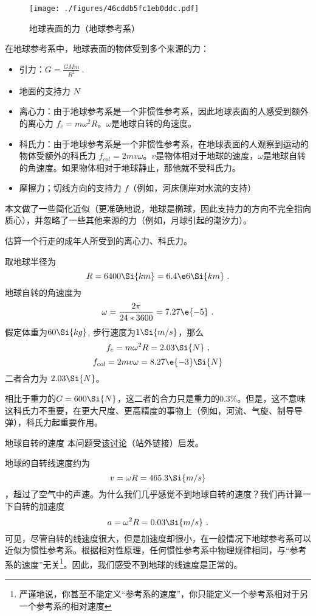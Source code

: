 
\begin{issues}
\issueDraft
{} 
\end{issues}

\begin{figure}[ht]
\centering
\texttt{[image: ./figures/46cddb5fc1eb0ddc.pdf]}
\caption{地球表面的力（地球参考系）} \label{fig_FOE_1}
\end{figure}

在地球参考系中，地球表面的物体受到多个来源的力：
\begin{itemize}
\item 引力：$G=\frac{GMm}{R^2}~.$
\item 地面的支持力 $N$
\item 离心力：由于地球参考系是一个非惯性参考系，因此地球表面的人感受到额外的离心力 $f_c = m \omega^2 R$。$\omega$是地球自转的角速度。
\item 科氏力：由于地球参考系是一个非惯性参考系，在地球表面的人观察到运动的物体受额外的科氏力 $f_{col} = 2 m v \omega$。$v$是物体相对于地球的速度，$\omega$是地球自转的角速度。如果物体相对于地球静止，那他就不受科氏力。
\item 摩擦力；切线方向的支持力 $f$（例如，河床侧岸对水流的支持）
\end{itemize}

本文做了一些简化近似（更准确地说，地球是椭球，因此支持力的方向不完全指向质心），并忽略了一些其他来源的力（例如，月球引起的潮汐力）。

\begin{example}{}
估算一个行走的成年人所受到的离心力、科氏力。

取地球半径为
$$R=6400\Si{km}=6.4\e6 \Si{km}~.$$
地球自转的角速度为
$$\omega = \frac{2\pi}{24*3600}=7.27\e{-5}~.$$
假定体重为$60 \Si{kg}$, 步行速度为$1 \Si{m/s}$，那么
$$
f_c = m \omega^2 R = 2.03 \Si{N}~,
$$
$$
f_{col} = 2 m v\omega = 8.27\e{-3} \Si{N}
$$
二者合力为 $2.03 \Si{N}$。

相比于重力的$G=600 \Si{N}$，这二者的合力只是重力的$0.3\%$。但是，这不意味这科氏力不重要，在更大尺度、更高精度的事物上（例如，河流、气旋、制导导弹），科氏力起重要作用。
\end{example}

\begin{example}{地球自转的速度}
本问题受\href{https://www.zhihu.com/question/579214803}{该讨论}（站外链接）启发。

地球的自转线速度约为 $$v=\omega R = 465.3 \Si{m/s}$$，超过了空气中的声速。为什么我们几乎感觉不到地球自转的速度？我们再计算一下自转的加速度
$$a=\omega^2 R= 0.03 \Si{m/s}~.$$
可见，尽管自转的线速度很大，但是加速度却很小，在一般情况下地球参考系可以近似为惯性参考系。根据相对性原理，任何惯性参考系中物理规律相同，与“参考系的速度”无关\footnote{严谨地说，你甚至不能定义“参考系的速度”，你只能定义一个参考系相对于另一个参考系的相对速度}。因此，我们感受不到地球的线速度是正常的。
\end{example}
